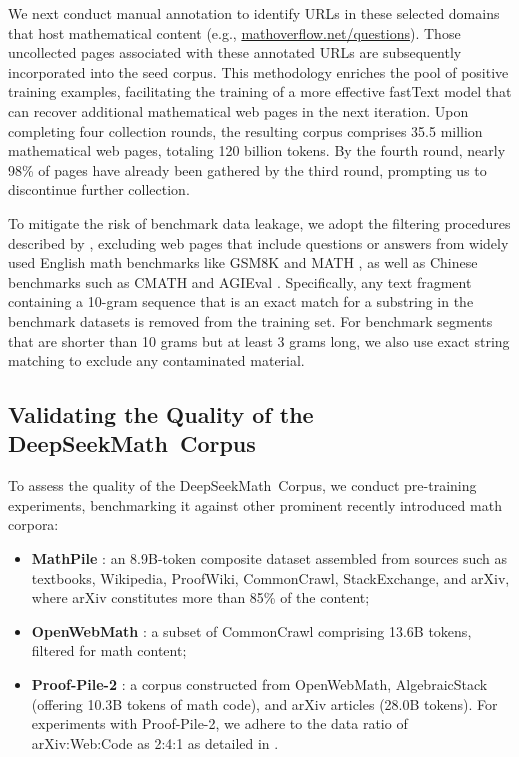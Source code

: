 We next conduct manual annotation to identify URLs in these selected domains that host mathematical content (e.g., \url{mathoverflow.net/questions}). Those uncollected pages associated with these annotated URLs are subsequently incorporated into the seed corpus. This methodology enriches the pool of positive training examples, facilitating the training of a more effective fastText model that can recover additional mathematical web pages in the next iteration. Upon completing four collection rounds, the resulting corpus comprises 35.5 million mathematical web pages, totaling 120 billion tokens. By the fourth round, nearly 98\% of pages have already been gathered by the third round, prompting us to discontinue further collection.

To mitigate the risk of benchmark data leakage, we adopt the filtering procedures described by \cite{deepseek-coder}, excluding web pages that include questions or answers from widely used English math benchmarks like GSM8K \citep{gsm8k} and MATH \citep{MATH}, as well as Chinese benchmarks such as CMATH \citep{wei2023cmath} and AGIEval \citep{agieval}. Specifically, any text fragment containing a 10-gram sequence that is an exact match for a substring in the benchmark datasets is removed from the training set. For benchmark segments that are shorter than 10 grams but at least 3 grams long, we also use exact string matching to exclude any contaminated material.

\subsection{Validating the Quality of the DeepSeekMath~Corpus}

To assess the quality of the DeepSeekMath~Corpus, we conduct pre-training experiments, benchmarking it against other prominent recently introduced math corpora:

\begin{itemize}[topsep=0pt]
    \item \textbf{MathPile} \citep{mathpile}: an 8.9B-token composite dataset assembled from sources such as textbooks, Wikipedia, ProofWiki, CommonCrawl, StackExchange, and arXiv, where arXiv constitutes more than 85\% of the content;
    \item \textbf{OpenWebMath} \citep{openwebmath}: a subset of CommonCrawl comprising 13.6B tokens, filtered for math content;
    \item \textbf{Proof-Pile-2} \citep{llemma}: a corpus constructed from OpenWebMath, AlgebraicStack (offering 10.3B tokens of math code), and arXiv articles (28.0B tokens). For experiments with Proof-Pile-2, we adhere to the data ratio of arXiv:Web:Code as 2:4:1 as detailed in \cite{llemma}.
\end{itemize}

